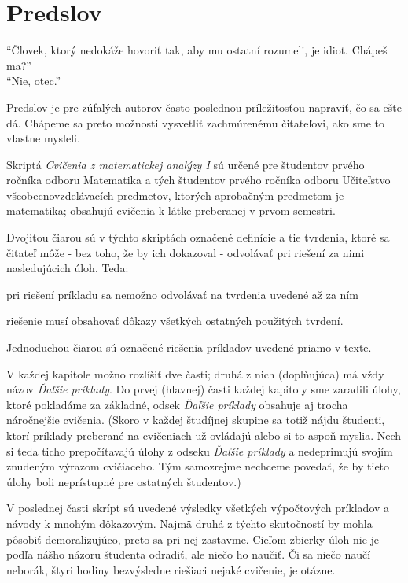 \addtocounter{chapter}{-1}
\chapter*{Predslov}

\setlength\epigraphrule{0pt}
\epigraph{
  \enquote{Človek, ktorý nedokáže hovoriť tak,
  aby mu ostatní rozumeli, je idiot.
  Chápeš ma?} \\
  \enquote{Nie, otec.}
}{}

Predslov je pre zúfalých autorov často poslednou príležitosťou napraviť,
čo sa ešte dá. Chápeme sa preto možnosti vysvetliť zachmúrenému čitateľovi,
ako sme to vlastne mysleli.

Skriptá \emph{Cvičenia z matematickej analýzy I} sú určené pre študentov prvého
ročníka odboru Matematika a tých študentov prvého ročníka odboru Učiteľstvo
všeobecnovzdelávacích predmetov, ktorých aprobačným predmetom je matematika;
obsahujú cvičenia k látke preberanej v prvom semestri.

Dvojitou čiarou sú v týchto skriptách označené definície a tie tvrdenia, ktoré
sa čitateľ môže - bez toho, že by ich dokazoval - odvolávať pri riešení za nimi
nasledujúcich úloh. Teda:
\begin{enumerate*}[label=\alph*)]
  \item pri riešení príkladu sa nemožno odvolávať na tvrdenia uvedené až za ním
  \item riešenie musí obsahovať dôkazy všetkých ostatných použitých tvrdení.
\end{enumerate*}

Jednoduchou čiarou sú označené riešenia príkladov uvedené priamo v texte.

V každej kapitole možno rozlíšiť dve časti; druhá z nich (doplňujúca) má vždy
názov \textit{Ďaľšie príklady}. Do prvej (hlavnej) časti každej kapitoly sme
zaradili úlohy, ktoré pokladáme za základné, odsek \textit{Ďaľšie príklady}
obsahuje aj trocha náročnejšie cvičenia. (Skoro v každej študíjnej skupine sa
totiž nájdu študenti, ktorí príklady preberané na cvičeniach už ovládajú alebo
si to aspoň myslia. Nech si teda ticho prepočítavajú úlohy z odseku
\textit{Ďaľšie príklady} a nedeprimujú svojím znudeným výrazom cvičiaceho. Tým
samozrejme nechceme povedať, že by tieto úlohy boli neprístupné pre ostatných
študentov.)

V poslednej časti skrípt sú uvedené výsledky všetkých výpočtových príkladov a
návody k mnohým dôkazovým. Najmä druhá z týchto skutočností by mohla pôsobiť
demoralizujúco, preto sa pri nej zastavme. Cieľom zbierky úloh nie je podľa
nášho názoru študenta odradiť, ale niečo ho naučiť. Či sa niečo naučí neborák,
štyri hodiny bezvýsledne riešiaci nejaké cvičenie, je otázne.

